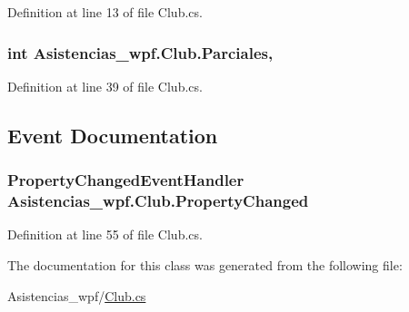 Definition at line 13 of file Club.\-cs.

\hypertarget{class_asistencias__wpf_1_1_club_a9f825c0495aa564e915d0f1a9e082186}{
\subsubsection[{Parciales}]{\setlength{\rightskip}{0pt plus 5cm}int Asistencias\-\_\-wpf.\-Club.\-Parciales\hspace{0.3cm}{\ttfamily [get]}, {\ttfamily [set]}}}\label{class_asistencias__wpf_1_1_club_a9f825c0495aa564e915d0f1a9e082186}


Definition at line 39 of file Club.\-cs.



\subsection{Event Documentation}
\hypertarget{class_asistencias__wpf_1_1_club_a1980fc9a90add0431cbf22f8a000cbf9}{
\subsubsection[{Property\-Changed}]{\setlength{\rightskip}{0pt plus 5cm}Property\-Changed\-Event\-Handler Asistencias\-\_\-wpf.\-Club.\-Property\-Changed}}\label{class_asistencias__wpf_1_1_club_a1980fc9a90add0431cbf22f8a000cbf9}


Definition at line 55 of file Club.\-cs.



The documentation for this class was generated from the following file\-:\begin{DoxyCompactItemize}
\item 
Asistencias\-\_\-wpf/\hyperlink{_club_8cs}{Club.\-cs}\end{DoxyCompactItemize}
